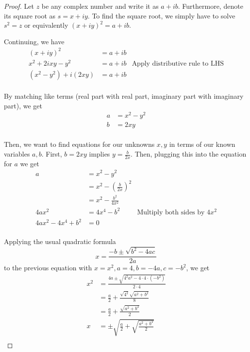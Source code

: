 \documentclass[]{article}
\begin{document}
\begin{proof}
	Let $z$ be any complex number and write it as $a + ib$. Furthermore, denote its square root as $s = x + iy$. To find the square root, we simply have to solve $s^2 = z$ or equivalently $(x + iy)^2 = a + ib$.
	
	\bigskip
	
	Continuing, we have
	\[\begin{aligned}
	(x + iy)^2 &= a + ib \\
	x^2 + 2ixy - y^2 &= a + ib & \text{Apply distributive rule to LHS}\\
	(x^2 - y^2) + i(2xy) &= a + ib \\
	\end{aligned}\]
	
	By matching like terms (real part with real part, imaginary part with imaginary part), we get
	\[\begin{aligned}
	a &= x^2 - y^2 \\
	b &= 2xy \\
	\end{aligned}\]
	
	Then, we want to find equations for our unknowns $x, y$ in terms of our known variables $a, b$. First, $b = 2xy$ implies $y = \frac{b}{2x}$. Then, plugging this into the equation for $a$ we get
	\[\begin{aligned}
	a
	&= x^2 - y^2 \\
	&= x^2 - (\frac{b}{2x})^2 \\
	&= x^2 - \frac{b^2}{4x^2} \\
	4ax^2 &= 4x^4 - b^2 & \text{Multiply both sides by $4x^2$} \\
	4ax^2 - 4x^4 + b^2 &= 0 \\
	\end{aligned}\]
	
	Applying the usual quadratic formula 
	\[x = \frac{-b \pm \sqrt{b^2 - 4ac}}{2a} \]
	to the previous equation with $x = x^2, a = 4, b=-4a, c=-b^2$,
	we get
	\[\begin{aligned}
	x^2
	&= \frac{4a \pm \sqrt{4^2a^2 - 4\cdot4\cdot(-b^2)}}{2\cdot4} \\
	&= \frac{a}{2} + \frac{\sqrt{4^2}\sqrt{a^2 + b^2}}{8} \\
	&= \frac{a}{2} + \frac{\sqrt{a^2 + b^2}}{2} \\
	x &= \pm \sqrt{\frac{a}{2} +
		\sqrt{\frac{a^2 + b^2}{2}}
	} \\
	\end{aligned}\]
\end{proof}
\end{document}
